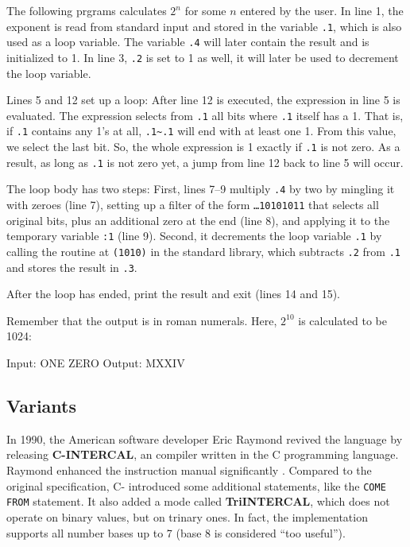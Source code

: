 The following prgrams calculates $2^n$ for some $n$ entered by the user. In line 1, the exponent is read from standard input and stored in the variable \texttt{.1}, which is also used as a loop variable. The variable \texttt{.4} will later contain the result and is initialized to 1. In line 3, \texttt{.2} is set to 1 as well, it will later be used to decrement the loop variable.

Lines 5 and 12 set up a loop: After line 12 is executed, the expression in line 5 is evaluated. The expression selects from \texttt{.1} all bits where \texttt{.1} itself has a 1. That is, if \texttt{.1} contains any 1's at all, \texttt{.1\~{}.1} will end with at least one 1. From this value, we select the last bit. So, the whole expression is 1 exactly if \texttt{.1} is not zero. As a result, as long as \texttt{.1} is not zero yet, a jump from line 12 back to line 5 will occur.

The loop body has two steps: First, lines 7--9 multiply \texttt{.4} by two by mingling it with zeroes (line 7), setting up a filter of the form \texttt{\dots10101011} that selects all original bits, plus an additional zero at the end (line 8), and applying it to the temporary variable \texttt{:1} (line 9). Second, it decrements the loop variable \texttt{.1} by calling the routine at \texttt{(1010)} in the standard library, which subtracts \texttt{.2} from \texttt{.1} and stores the result in \texttt{.3}.

After the loop has ended, print the result and exit (lines 14 and 15).



Remember that the output is in roman numerals. Here, $2^{10}$ is calculated to be 1024:

\begin{io}
Input: ONE ZERO
Output: MXXIV
\end{io}

\subsection{Variants}
\label{intercal-variants}

In 1990, the American software developer Eric Raymond revived the language by releasing \textbf{C-INTERCAL}, an \ic{} compiler written in the C programming language. Raymond enhanced the instruction manual significantly \cite{raymond2010cintercal}. Compared to the original \ic{} specification, C-\ic{} introduced some additional statements, like the \texttt{COME FROM} statement. It also added a mode called \textbf{TriINTERCAL}, which does not operate on binary values, but on trinary ones. In fact, the implementation supports all number bases up to 7 (base 8 is considered “too useful”).

